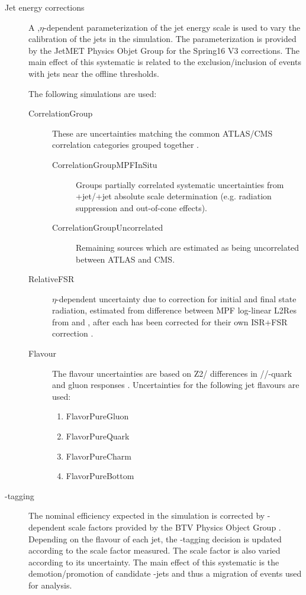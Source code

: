 \begin{description}
\item[Jet energy corrections] A \pt,$\eta$-dependent parameterization of the jet energy scale is used to vary the calibration of the jets in the simulation. The parameterization is provided by the JetMET Physics Objet Group \cite{twiki:JES} for the Spring16 V3 corrections. The main effect of this systematic is related to the exclusion/inclusion of events with jets near the offline thresholds.

The following simulations are used:
\begin{description}
        \item[CorrelationGroup]  These are uncertainties matching the common ATLAS/CMS correlation categories grouped together \cite{twiki:JESUS}. 
        \begin{description}                     
              \item[CorrelationGroupMPFInSitu] Groups partially correlated systematic uncertainties from \cPZ+jet/\cPgg+jet absolute scale determination (e.g. radiation suppression and out-of-cone effects).
              \item[CorrelationGroupUncorrelated] Remaining sources which are estimated as being uncorrelated between ATLAS and CMS.
        \end{description}
        \item[RelativeFSR] $\eta$-dependent uncertainty due to correction for initial and final state radiation, estimated from difference between MPF log-linear L2Res from  and \HERWIGpp, after each has been corrected for their own ISR+FSR correction \cite{Khachatryan:2016kdb}.
        \item[Flavour]  The flavour uncertainties are based on  Z2/ differences in \cPqu\cPqd\cPqs/\cPqc/\cPqb-quark and gluon responses \cite{Khachatryan:2016kdb}. Uncertainties for the following jet flavours are used:
        \begin{enumerate}
                \item FlavorPureGluon
                \item FlavorPureQuark
                \item FlavorPureCharm
                \item FlavorPureBottom
        \end{enumerate}
\end{description}

\item[\cPqb-tagging] The nominal efficiency expected in the simulation is corrected by \pt-dependent scale factors provided by the BTV Physics Object Group \cite{twiki:BTV}. Depending on the flavour of each jet, the \cPqb-tagging decision is updated according to the scale factor measured. The scale factor is also varied according to its uncertainty. The main effect of this systematic is the demotion/promotion of candidate \cPqb-jets and thus a migration of events used for analysis.


\end{description}
